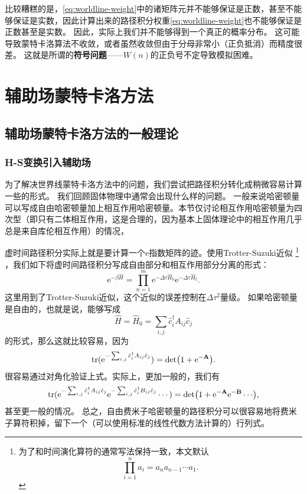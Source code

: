 \documentclass[hyperref, UTF8, a4paper]{ctexart}
\newcommand*{\ee}{\mathrm{e}}
\newcommand*{\concept}[1]{{\textbf{#1}}}
\begin{document}

比较糟糕的是，\eqref{eq:worldline-weight}中的诸矩阵元并不能够保证是正数，甚至不能够保证是实数，因此计算出来的路径积分权重\eqref{eq:worldline-weight}也不能够保证是正数甚至是实数。
因此，实际上我们并不能够得到一个真正的概率分布。
这可能导致蒙特卡洛算法不收敛，或者虽然收敛但由于分母非常小（正负抵消）而精度很差。
这就是所谓的\concept{符号问题}——$W(n)$的正负号不定导致模拟困难。

\section{辅助场蒙特卡洛方法}

\subsection{辅助场蒙特卡洛方法的一般理论}

\subsubsection{H-S变换引入辅助场}

为了解决世界线蒙特卡洛方法中的问题，我们尝试把路径积分转化成稍微容易计算一些的形式。
我们回顾固体物理中通常会出现什么样的问题。
一般来说哈密顿量可以写成自由哈密顿量加上相互作用哈密顿量。本节仅讨论相互作用哈密顿量为四次型（即只有二体相互作用，这是合理的，因为基本上固体理论中的相互作用几乎总是来自库伦相互作用）的情况，

虚时间路径积分实际上就是要计算一个$\ee$指数矩阵的迹。使用Trotter-Suzuki近似%
\footnote{为了和时间演化算符的通常写法保持一致，本文默认
\[
    \prod_{i=1}^n a_i = a_n a_{n-1} \cdots a_1.
\]
}%
，我们如下将虚时间路径积分写成自由部分和相互作用部分分离的形式：
\[
    \ee^{-\beta \hat{H}} = \prod_{n=1}^{m} \ee^{-\Delta \tau \hat{H}_0} \ee^{-\Delta \tau \hat{H}_\text{I}}.
\]
这里用到了Trotter-Suzuki近似，这个近似的误差控制在$\Delta \tau^2$量级。%
如果哈密顿量是自由的，也就是说，能够写成
\[
    \hat{H} = \hat{H}_0 = \sum_{i, j} \hat{c}_i^\dagger A_{ij} \hat{c}_j
\]
的形式，那么这就比较容易，因为
\begin{equation}
    \trace(\ee^{- \sum_{i, j} \hat{c}_i^\dagger A_{ij} \hat{c}_j}) = \det(1 + \ee^{- \vb{A}}).
\end{equation}
很容易通过对角化验证上式。实际上，更加一般的，我们有
\begin{equation}
    \trace(\ee^{- \sum_{i, j} \hat{c}_i^\dagger A_{ij} \hat{c}_j} \ee^{- \sum_{i, j} \hat{c}_i^\dagger B_{ij} \hat{c}_j} \cdots) = \det(1 + \ee^{- \vb{A}}\ee^{- \vb{B}} \cdots),
    \label{eq:trace-to-det}
\end{equation}
甚至更一般的情况。
总之，自由费米子哈密顿量的路径积分可以很容易地将费米子算符积掉，留下一个（可以使用标准的线性代数方法计算的）行列式。
\end{document}
